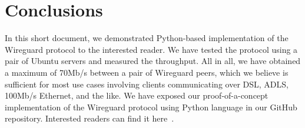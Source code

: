 \section{Conclusions}
\label{section:conclusion}

In this short document, we demonstrated Python-based implementation of the 
Wireguard protocol to the interested reader. We have tested the protocol 
using a pair of Ubuntu servers and measured the throughput. All in all, 
we have obtained a maximum of 70Mb/s between a pair of Wireguard peers, 
which we believe is sufficient for most use cases involving clients 
communicating over DSL, ADLS, 100Mb/s Ethernet, and the like. We have 
exposed our proof-of-a-concept implementation of the Wireguard protocol 
using Python language in our GitHub repository. Interested readers can 
find it here~\cite{wireguard:poci}.